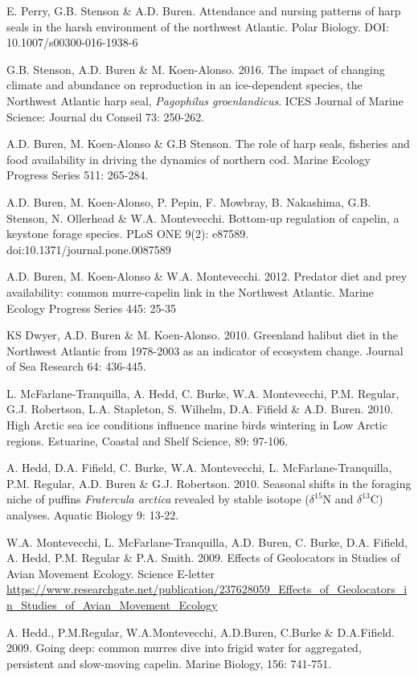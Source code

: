 \documentclass{res}
\begin{document}
\begin{resume}
\begin{hangparas}{.4in}{1}
E. Perry, G.B. Stenson \& A.D. Buren. Attendance and nursing patterns of harp seals in the harsh environment of the northwest Atlantic. Polar Biology. DOI: 10.1007/s00300-016-1938-6

G.B. Stenson, A.D. Buren \& M. Koen-Alonso. 2016. The impact of changing climate and abundance on reproduction in an ice-dependent species, the Northwest Atlantic harp seal, \textit{Pagophilus groenlandicus}. ICES Journal of Marine Science: Journal du Conseil 73: 250-262.

A.D. Buren, M. Koen-Alonso \& G.B Stenson. The role of harp seals, fisheries and food availability in driving the dynamics of northern cod. Marine Ecology Progress Series 511: 265-284.

A.D. Buren, M. Koen-Alonso, P. Pepin, F. Mowbray, B. Nakashima, G.B. Stenson, N. Ollerhead \& W.A. Montevecchi. Bottom-up regulation of capelin, a keystone forage species. PLoS ONE 9(2): e87589. doi:10.1371/journal.pone.0087589

A.D. Buren, M. Koen-Alonso \& W.A. Montevecchi. 2012. Predator diet and prey availability: common murre-capelin link in the Northwest Atlantic. Marine Ecology Progress Series 445: 25-35

KS Dwyer, A.D. Buren \& M. Koen-Alonso. 2010. Greenland halibut diet in the Northwest Atlantic from 1978-2003 as an indicator of ecosystem change. Journal of Sea Research 64: 436-445. 

L. McFarlane-Tranquilla, A. Hedd, C. Burke, W.A. Montevecchi, P.M. Regular, G.J. Robertson, L.A. Stapleton, S. Wilhelm, D.A. Fifield \& A.D. Buren. 2010. High Arctic sea ice conditions influence marine birds wintering in Low Arctic regions. Estuarine, Coastal and Shelf Science, 89: 97-106.

A. Hedd, D.A. Fifield, C. Burke, W.A. Montevecchi, L. McFarlane-Tranquilla, P.M. Regular, A.D. Buren \& G.J. Robertson. 2010. Seasonal shifts in the foraging niche of puffins \textit{Fratercula arctica} revealed by stable isotope ($\delta^{15}$N and $\delta^{13}$C) analyses. Aquatic Biology 9: 13-22.

W.A. Montevecchi, L. McFarlane-Tranquilla, A.D. Buren, C. Burke, D.A. Fifield, A. Hedd, P.M. Regular \& P.A. Smith. 2009. Effects of Geolocators in Studies of Avian Movement Ecology. Science E-letter \url{https://www.researchgate.net/publication/237628059_Effects_of_Geolocators_in_Studies_of_Avian_Movement_Ecology}

A. Hedd., P.M.Regular, W.A.Montevecchi, A.D.Buren, C.Burke \& D.A.Fifield. 2009. Going deep: common murres dive into frigid water for aggregated, persistent and slow-moving capelin. Marine Biology, 156: 741-751.


\end{hangparas}
\end{resume}
\end{document}
